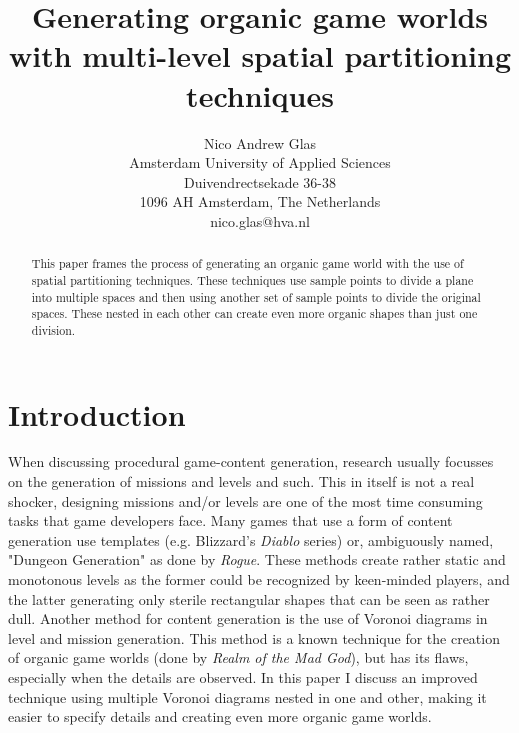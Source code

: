\documentclass[11pt,a4paper,twocolumn]{article}
\title{\textbf{Generating organic game worlds with multi-level spatial partitioning techniques}}
\author{ \small Nico Andrew Glas \\ \small Amsterdam University of Applied Sciences \\ \small Duivendrectsekade 36-38 \\ \small 1096 AH Amsterdam, The Netherlands \\ \small nico.glas@hva.nl}
\begin{document}
\maketitle  

\begin{abstract}
This paper frames the process of generating an organic game world with the use of spatial partitioning techniques. These techniques use sample points to divide a plane into multiple spaces and then using another set of sample points to divide the original spaces. These nested in each other can create even more organic shapes than just one division.
\end{abstract}

\section{Introduction}
When discussing procedural game-content generation, research usually focusses on the generation of missions and levels and such. This in itself is not a real shocker, designing missions and/or levels are one of the most time consuming tasks that game developers face. Many games that use a form of content generation use templates (e.g. Blizzard's \emph{Diablo} series) or, ambiguously named, "Dungeon Generation" as done by \emph{Rogue}. These methods create rather static and monotonous levels as the former could be recognized by keen-minded players, and the latter generating only sterile rectangular shapes that can be seen as rather dull. Another method for content generation is the use of Voronoi diagrams in level and mission generation. This method is a known technique\cite{patel} for the creation of organic game worlds (done by \emph{Realm of the Mad God}), but has its flaws, especially when the details are observed. In this paper I discuss an improved technique using multiple Voronoi diagrams nested in one and other, making it easier to specify details and creating even more organic game worlds.
\end{document}
